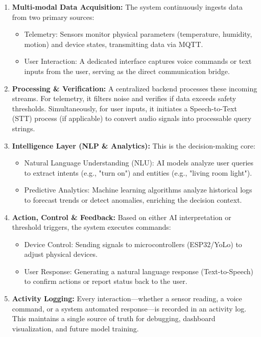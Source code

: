 \begin{enumerate} 
    \item \textbf{Multi-modal Data Acquisition:} 
    The system continuously ingests data from two primary sources:
    \begin{itemize}
        \item  Telemetry: Sensors monitor physical parameters (temperature, humidity, motion) and device states, transmitting data via MQTT.
        \item User Interaction: A dedicated interface captures voice commands or text inputs from the user, serving as the direct communication bridge.
    \end{itemize}

    \item \textbf{Processing \& Verification:} 
    A centralized backend processes these incoming streams. For telemetry, it filters noise and verifies if data exceeds safety thresholds. Simultaneously, for user inputs, it initiates a Speech-to-Text (STT) process (if applicable) to convert audio signals into processable query strings.

    \item \textbf{Intelligence Layer (NLP \& Analytics):} 
    This is the decision-making core:
    \begin{itemize}
        \item Natural Language Understanding (NLU): AI models analyze user queries to extract intents (e.g., "turn on") and entities (e.g., "living room light").
        \item Predictive Analytics: Machine learning algorithms analyze historical logs to forecast trends or detect anomalies, enriching the decision context.
    \end{itemize}

    \item \textbf{Action, Control \& Feedback:} 
    Based on either AI interpretation or threshold triggers, the system executes commands:
    \begin{itemize}
        \item Device Control: Sending signals to microcontrollers (ESP32/YoLo) to adjust physical devices.
        \item User Response: Generating a natural language response (Text-to-Speech) to confirm actions or report status back to the user.
    \end{itemize}

    \item \textbf{Activity Logging:} 
    Every interaction—whether a sensor reading, a voice command, or a system automated response—is recorded in an activity log. This maintains a single source of truth for debugging, dashboard visualization, and future model training.
\end{enumerate}

